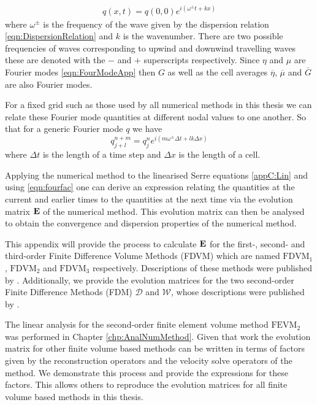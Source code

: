 \begin{align}
q(x,t) = q(0,0) e^{i\left(\omega^\pm t + kx\right)}
\label{eqn:FourModeApp}
\end{align}
where $\omega^\pm$ is the frequency of the wave given by the dispersion relation \eqref{eqn:DispersionRelation}  and $k$ is the wavenumber. There are two possible frequencies of waves corresponding to upwind and downwind travelling waves these are denoted with the $-$ and $+$ superscripts respectively. Since $\eta$ and $\mu$ are Fourier modes \eqref{eqn:FourModeApp} then $G$ as well as the cell averages $\overline{\eta}$, $\overline{\mu}$ and $\overline{G}$ are also Fourier modes.

For a fixed grid such as those used by all numerical methods in this thesis we can relate these Fourier mode quantities at different nodal values to one another. So that for a generic Fourier mode $q$ we have
\begin{equation}
q^{n + m}_{j + l} = q^n_j e^{ i \left(m \omega^\pm \Delta t + l k \Delta x\right)}
\label{eqn:fourfac}
\end{equation}
where $\Delta t$ is the length of a time step and $\Delta x$ is the length of a cell. 


Applying the numerical method to the linearised Serre equations \eqref{appC:Lin} and using \eqref{eqn:fourfac} one can derive an expression relating the quantities at the current and earlier times to the quantities at the next time via the evolution matrix $\mathbf{E}$ of the numerical method. This evolution matrix can then be analysed to obtain the convergence and dispersion properties of the numerical method. 

This appendix will provide the process to calculate $\mathbf{E}$ for the first-, second- and third-order Finite Difference Volume Methods (FDVM) which are named $\text{FDVM}_1$, $\text{FDVM}_2$ and $\text{FDVM}_3$ respectively. Descriptions of these methods were published by \citet{Zoppou-etal-2017}. Additionally, we provide the evolution matrices for the two second-order Finite Difference Methods (FDM) $\mathcal{D}$ and $\mathcal{W}$, whose descriptions were published by \citet{Pitt-2018-61}. 

The linear analysis for the second-order finite element volume method $\text{FEVM}_2$ was performed in Chapter \ref{chp:AnalNumMethod}. Given that work the evolution matrix for other finite volume based methods can be written in terms of factors given by the reconstruction operators and the velocity solve operators of the method. We demonstrate this process and provide the expressions for these factors. This allows others to reproduce the evolution matrices for all finite volume based methods in this thesis.  

